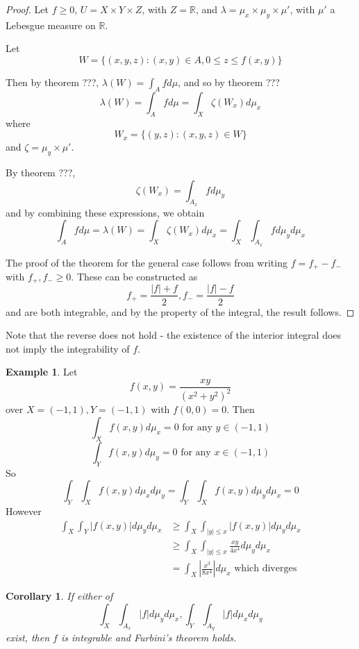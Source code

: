 \documentclass[11pt,a4paper]{report}
\newtheorem{corollary}[theorem]{Corollary}
\theoremstyle{plain}
\theoremstyle{definition}
\newtheorem*{eg}{Example}
\theoremstyle{remark}
\newcommand{\R}{\mathbb{R}}
\newcommand{\abs}[1]{\left| #1 \right|}
\begin{document}
\begin{proof}
    Let $f \ge 0$, $U = X \times Y \times Z$, with $Z = \R$, and $\lambda = \mu_x \times \mu_y \times \mu'$, with $\mu'$ a Lebesgue measure on $\R$.

    Let
    $$ W = \{ (x, y, z) : (x, y) \in A, 0 \le z \le f(x, y) \} $$

    Then by theorem ???, $\lambda(W) = \int_A f d\mu$, and so by theorem ???
    $$ \lambda(W) = \int_A f d\mu = \int_X \zeta(W_x) d \mu_x $$
    where
    $$ W_x = \{ (y, z) : (x, y, z) \in W \} $$
    and $\zeta = \mu_y \times \mu'$.

    By theorem ???,
    $$ \zeta(W_x) = \int_{A_x} f d\mu_y $$
    and by combining these expressions, we obtain
    $$ \int_A f d\mu = \lambda(W) = \int_X \zeta(W_x) d\mu_x = \int_X \int_{A_x} f d\mu_y d\mu_x $$

    The proof of the theorem for the general case follows from writing $ f = f_{+} - f_{-}$ with $f_{+}, f_{-} \ge 0$. These can be constructed as
    $$ f_{+} = \frac{\abs{f} + f}{2}, f_{-} = \frac{\abs{f} - f}{2} $$
    and are both integrable, and by the property of the integral, the result follows.
\end{proof}

Note that the reverse does not hold - the existence of the interior integral does not imply the integrability of $f$.

\begin{eg}
  Let 
  $$f(x, y) = \frac{xy}{(x^2 + y^2)^2}$$
  over $X = (-1, 1), Y = (-1, 1)$ with $f(0, 0) = 0$. Then
  $$ \int_X f(x, y) d \mu_x = 0 \text{ for any } y \in (-1, 1) $$
  $$ \int_Y f(x, y) d \mu_y = 0 \text{ for any } x \in (-1, 1) $$
  So
  $$ \int_Y \int_X f(x, y) d\mu_x d\mu_y = \int_Y \int_X f(x, y) d\mu_y d\mu_x = 0 $$
  However
  \begin{align*}
      \int_X \int_Y \abs{f(x, y)} d\mu_y d\mu_x &\ge \int_X \int_{\abs{y} \le x} \abs{f(x, y)} d\mu_y d\mu_x \\
      &\ge \int_X \int_{\abs{y} \le x} \frac{xy}{4x^4} d\mu_y d\mu_x \\
      &= \int_X \abs{\frac{x^3}{8x^4}} d\mu_x \text{ which diverges}
  \end{align*}
\end{eg}

\begin{corollary}
  If either of
 $$ \int_X \int_{A_x} \abs{f} d\mu_y d\mu_x, \int_Y \int_{A_y} \abs{f} d\mu_x d\mu_y $$
  exist, then $f$ is integrable and Furbini's theorem holds.
\end{corollary}
\end{document}
